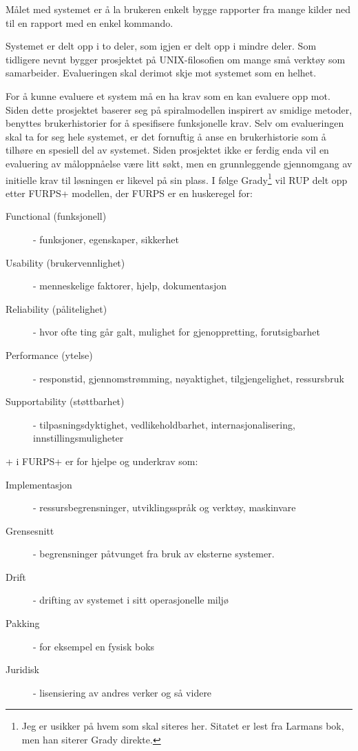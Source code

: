 \documentclass[11pt]{article}
\begin{document}
Målet med systemet er å la brukeren enkelt bygge rapporter fra mange kilder ned til en rapport med en enkel kommando.

Systemet er delt opp i to deler, som igjen er delt opp i mindre deler.
Som tidligere nevnt bygger prosjektet på UNIX-filosofien om mange små verktøy som samarbeider.
Evalueringen skal derimot skje mot systemet som en helhet.

For å kunne evaluere et system må en ha krav som en kan evaluere opp mot.
Siden dette prosjektet baserer seg på spiralmodellen inspirert av smidige metoder,
benyttes brukerhistorier for å spesifisere funksjonelle krav.
Selv om evalueringen skal ta for seg hele systemet,
er det fornuftig å anse en brukerhistorie som å tilhøre en spesiell del av systemet.
Siden prosjektet ikke er ferdig enda vil en evaluering av måloppnåelse være litt søkt,
men en grunnleggende gjennomgang av initielle krav til løsningen er likevel på sin plass.
I følge Grady\cite{Grady1992}\footnote{Jeg er usikker på hvem som skal siteres her. Sitatet er lest fra Larmans bok, men han siterer Grady direkte.} vil RUP delt opp etter FURPS+ modellen, der FURPS er en huskeregel for: \\ %
\begin{description}
\item [Functional (funksjonell)]
  - funksjoner, egenskaper, sikkerhet
\item [Usability (brukervennlighet)]
  - menneskelige faktorer, hjelp, dokumentasjon
\item [Reliability (pålitelighet)]
  - hvor ofte ting går galt, mulighet for gjenoppretting, forutsigbarhet
\item [Performance (ytelse)]
  - responstid, gjennomstrømming, nøyaktighet, tilgjengelighet, ressursbruk
\item [Supportability (støttbarhet)]
  - tilpasningsdyktighet, vedlikeholdbarhet, internasjonalisering, innstillingsmuligheter
\end{description}
+ i FURPS+ er for hjelpe og underkrav som:
\begin{description}
\item [Implementasjon]
  - ressursbegrensninger, utviklingsspråk og verktøy, maskinvare
\item [Grensesnitt]
  - begrensninger påtvunget fra bruk av eksterne systemer.
\item [Drift]
  - drifting av systemet i sitt operasjonelle miljø
\item [Pakking]
  - for eksempel en fysisk boks
\item [Juridisk]
  - lisensiering av andres verker og så videre
\end{description}
\end{document}
